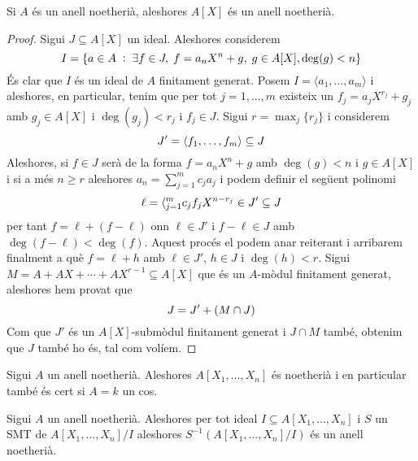 \documentclass[../../../main.tex]{subfiles}
\begin{document}
\begin{ter}
\label{ter:baseHilbert} Si $A$ és un anell noetherià, aleshores $A[X]$ és un anell noetherià.
\end{ter}
\begin{proof}
Sigui $J\subseteq A[X]$ un ideal. Aleshores considerem
\begin{equation}
    \notag
    I = \{a\in A\;:\;\exists f\in J,\;f=a_nX^n+g,\;g\in A[X],\deg(g)<n\}
\end{equation}
És clar que $I$ és un ideal de $A$ finitament generat. Posem $I = \langle a_1,\ldots,a_m\rangle$ i aleshores, en particular, tenim que per tot $j = 1,\ldots,m$ existeix un $f_j = a_jX^{r_j}+g_j$ amb $g_j\in A[X]$ i $\deg(g_j)<r_j$ i $f_j\in J$. Sigui $r = \max_j\{r_j\}$ i considerem
\begin{equation}
    \notag
    J' = \langle f_1,\ldots,f_m\rangle\subseteq J
\end{equation}
Aleshores, si $f\in J$ serà de la forma $f = a_nX^n+g$ amb $\deg(g)<n$ i $g\in A[X]$ i si a més $n\geq r$ aleshores $a_n = \sum_{j=1}^mc_ja_j$ i podem definir el següent polinomi
\begin{equation}
    \notag
    \ell = \langle_{j=1}^mc_jf_jX^{n-r_j}\in J'\subseteq J
\end{equation}
per tant $f = \ell+(f-\ell)$ onn $\ell\in J'$ i $f-\ell\in J$ amb $\deg(f-\ell)<\deg(f)$. Aquest procés el podem anar reiterant i arribarem finalment a què $f = \ell+h$ amb $\ell\in J'$, $h\in J$ i $\deg(h)<r$. Sigui $M = A+AX+\cdots+AX^{r-1}\subseteq A[X]$ que és un $A$-mòdul finitament generat, aleshores hem provat que
\begin{equation}
    \notag
    J = J'+(M\cap J)
\end{equation}
Com que $J'$ és un $A[X]$-submòdul finitament generat i $J\cap M$ també, obtenim que $J$ també ho és, tal com volíem.
\end{proof}

\begin{coro}
Sigui $A$ un anell noetherià. Aleshores $A[X_1,\ldots,X_n]$ és noetherià i en particular també és cert si $A = k$ un cos.
\end{coro}

\begin{coro}
Sigui $A$ un anell noetherià. Aleshores per tot ideal $I\subseteq A[X_1,\ldots,X_n]$ i $S$ un SMT de $A[X_1,\ldots,X_n]/I$ aleshores $S^{-1}(A[X_1,\ldots,X_n]/I)$ és un anell noetherià.
\end{coro}
\end{document}
